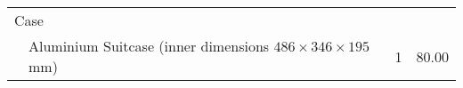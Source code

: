 \begin{center}
\begin{longtable}{llrr}
	\midrule
	\multicolumn{2}{l}{Case}\\
	& Aluminium Suitcase (inner dimensions $486 \times 346 \times 195$ mm) & 1 & 80.00\\

	\bottomrule
\end{longtable}
\end{center}
